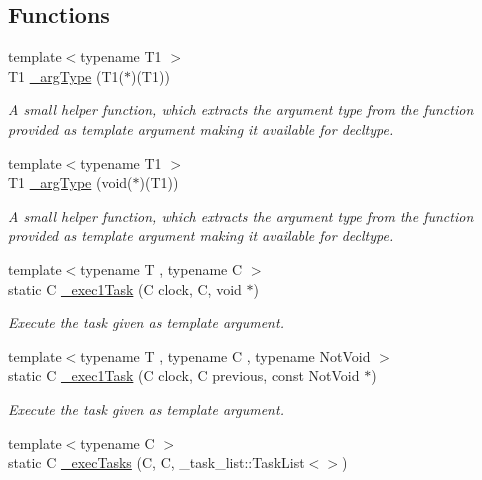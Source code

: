 \subsection*{Functions}
\begin{DoxyCompactItemize}
\item 
{\footnotesize template$<$typename T1 $>$ }\\T1 \hyperlink{namespacetasks_ac4a797a86584958bef0b67616a38c8ae}{\+\_\+arg\+Type} (T1($\ast$)(T1))
\begin{DoxyCompactList}\small\item\em A small helper function, which extracts the {\itshape argument} type from the function provided as template argument making it available for decltype. \end{DoxyCompactList}\item 
{\footnotesize template$<$typename T1 $>$ }\\T1 \hyperlink{namespacetasks_a7950bab5a2847e4ea072b489e93855cb}{\+\_\+arg\+Type} (void($\ast$)(T1))
\begin{DoxyCompactList}\small\item\em A small helper function, which extracts the {\itshape argument} type from the function provided as template argument making it available for decltype. \end{DoxyCompactList}\item 
{\footnotesize template$<$typename T , typename C $>$ }\\static C \hyperlink{namespacetasks_acc347173bd59f335faea1d7f1fcae0eb}{\+\_\+exec1\+Task} (C clock, C, void $\ast$)
\begin{DoxyCompactList}\small\item\em Execute the task given as template argument. \end{DoxyCompactList}\item 
{\footnotesize template$<$typename T , typename C , typename Not\+Void $>$ }\\static C \hyperlink{namespacetasks_ab00f443870b6da2320bc20560d04fd6a}{\+\_\+exec1\+Task} (C clock, C previous, const Not\+Void $\ast$)
\begin{DoxyCompactList}\small\item\em Execute the task given as template argument. \end{DoxyCompactList}\item 
{\footnotesize template$<$typename C $>$ }\\static C \hyperlink{namespacetasks_af00e6efc55bc4106e367bdda832a5f3a}{\+\_\+exec\+Tasks} (C, C, \+\_\+task\+\_\+list\+::\+Task\+List$<$$>$)
$$
\end{DoxyCompactItemize}
